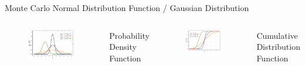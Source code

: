 \documentclass[12pt, aspectratio=169]{beamer}
\begin{document}
\begin{frame}{Monte Carlo}
  Normal Distribution Function / Gaussian Distribution
  \begin{columns}
    \centering
    \begin{figure}
      \includegraphics[width=\textwidth]{1024px-norm.png}
    \end{figure}
    Probability Density Function
    \centering
    \begin{figure}
      \includegraphics[width=\textwidth]{800px-dist.png}
    \end{figure}
    Cumulative Distribution Function
  \end{columns}
\end{frame}
\end{document}
